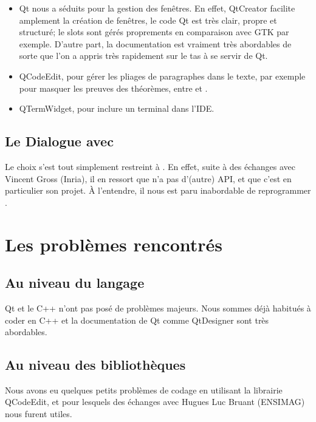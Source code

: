 \begin{itemize} 
  \item Qt nous a séduits pour la gestion des fenêtres.
    En effet, QtCreator facilite amplement la création de fenêtres, le code Qt est très clair, propre et structuré; le slots sont gérés proprements en comparaison avec GTK par exemple.
    D'autre part, la documentation est vraiment très abordables de sorte que l'on a appris très rapidement sur le tas à se servir de Qt.
    
  \item QCodeEdit, pour gérer les pliages de paragraphes dans le texte, par exemple pour masquer les preuves des théorèmes, entre  et .
  
  \item QTermWidget, pour inclure un terminal dans l'IDE.  
\end{itemize}

\subsection{Le Dialogue avec \Coq{}}
    
Le choix s'est tout simplement restreint à \coqtop{}. 
En effet, suite à des échanges avec Vincent Gross (Inria), il en ressort que \Coq{} n'a pas d'(autre) API, et que c'est en particulier son projet. À l'entendre, il nous est paru inabordable de reprogrammer \coqtop{}. 
        
\section{Les problèmes rencontrés}

\subsection{Au niveau du langage}

Qt et le C++ n'ont pas posé de problèmes majeurs. Nous sommes déjà habitués à coder en C++ et la documentation de Qt comme QtDesigner sont très abordables.
    
\subsection{Au niveau des bibliothèques}

Nous avons eu quelques petits problèmes de codage en utilisant la librairie QCodeEdit, et pour lesquels des échanges avec Hugues Luc Bruant (ENSIMAG) nous furent utiles.

